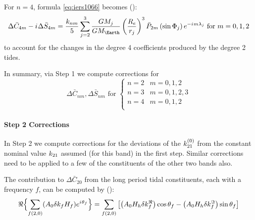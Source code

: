 For $n=4$, formula \autoref{eq:iers1066} becomes (\cite{iers2010}):
\begin{equation}
\Delta \bar{C}_{4m} - \iim \Delta \bar{S}_{4m} = \frac{\lovek _{nm}}{5}
  \sum^{3}_{j=2} \frac{GM_j}{GM_\Earth} \left( \frac{R_e}{r_j} \right) ^{3} 
  \bar{P}_{2m} \left( \sin \Phi _j \right) e^{-\iim m \lambda _j} \text{ for } m=0,1,2
  \label{eq:iers1067}
\end{equation}
to account for the changes in the degree 4 coefficients produced by the 
degree 2 tides.

In summary, via Step 1 we compute corrections for 
\begin{equation}
  \Delta \bar{C}_{nm}, \Delta \bar{S}_{nm} \text{ for }
    \begin{cases}
      n=2 & m=0,1,2 \\
      n=3 & m=0,1,2,3 \\
      n=4 & m=0,1,2\\
    \end{cases}
\end{equation} 

\paragraph{Step 2 Corrections}\label{par:step2-corr-earth-tides}
In Step 2 we compute corrections for the deviations of the 
$k ^{(0)}_{21}$ from the constant nominal value $k _{21}$ 
assumed (for this band) in the first step. Similar corrections need to be 
applied to a few of the constituents of the other two bands also.

The contribution to $\Delta \bar{C}_{20}$ from the long period tidal 
constituents, each with a frequency $f$, can be computed by (\cite{iers2010}):
\begin{equation}
  \Re \Bigl\{ \sum _{f(2,0)}(A_0 \delta k_f H_f) e^{{i\mkern1mu} \theta _f} \Bigr\} = 
    \sum_{f(2,0)} \left[ \left(A_0 H_h \delta k^\Re _f \right) \cos \theta _f 
      - \left(A_0 H_h \delta k^\Im _f \right) \sin \theta _f 
    \right]
  \label{eq:iers1068a}
\end{equation}

